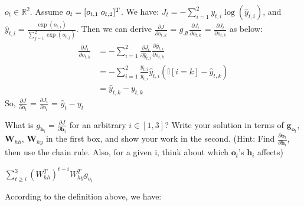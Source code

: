 \documentclass[11pt,addpoints,answers]{exam}
\newcommand{\gv}{\mathbf{g}}
\newcommand{\hv}{\mathbf{h}}
\newcommand{\ov}{\mathbf{o}}
\newcommand{\Wv}{\mathbf{W}}
\begin{document}
\begin{questions}
\begin{parts}
\begin{subparts}
\begin{subsubparts}
    \begin{your_solution}[title=Work,height=6cm,width=14cm]
    \small
    $o_t \in \mathbb{R}^2$. Assume $o_t = [o_{t,1} \hspace{1mm} o_{t,2}]^T$. We have: $J_t = -\sum_{i=1}^{2} y_{t,i} \log(\hat{y}_{t,i})$, and $\hat{y}_{t,i} = \frac{\exp(o_{t,i})}{\sum_{j=1}^{2} \exp(o_{t,j})}$. Then we can derive $\frac{\partial J}{\partial o_{t,k}}$ = $g_{Jt}$$\frac{\partial J_{t}}{\partial o_{t,k}}$ = $\frac{\partial J_{t}}{\partial o_{t,k}}$ as below:\\
    \[
    \begin{aligned}
    	\frac{\partial J_t}{\partial o_{t,k}} &= -\sum_{i=1}^{2} \frac{\partial J_t}{\partial \hat{y}_{t,i}} \frac{\partial \hat{y}_{t,i}}{\partial o_{t,k}}    \\&= -\sum_{i=1}^{2} \frac{y_{t,i}}{\hat{y}_{t,i}} \hat{y}_{t, i} (\mathbb{I}[i = k] - \hat{y}_{t, k})
    	                                    \\&= \hat{y}_{t, k} - y_{t,k}
    \end{aligned}
    \]
    So, $\frac{\partial J}{\partial o_{t}}$ = $\frac{\partial J_t}{\partial o_{t}}$ = $\hat{y}_{t} - y_{t}$
    \end{your_solution}

\clearpage
    \subsubpart[2] What is $g_{\hv_i} = \frac{\partial J}{\partial \hv_i}$ for an arbitrary $i \in [1,3]$? Write your solution in terms of $\gv_{\ov_t}$, $\Wv_{hh}$, $\Wv_{hy}$ in the first box, and show your work in the second. (Hint: Find $\frac{\partial \ov_t}{\partial \hv_i}$, then use the chain rule. Also, for a given i, think about which $\ov_t$'s  $\hv_i$ affects)
        
    \begin{your_solution}[title=$\frac{\partial J}{\partial \hv_i}$,height=2.5cm,width=8.5cm]
    $\sum_{t \geq i}^{3} \left(W_{hh}^T\right)^{t-i} W_{hy}^T g_{o_t}$
    \end{your_solution}
    
    \begin{your_solution}[title=Work,height=6cm,width=14cm]
    \scriptsize
    According to the definition above, we have:
    

\end{your_solution}
\end{subsubparts}
\end{subparts}
\end{parts}
\end{questions}
\end{document}
